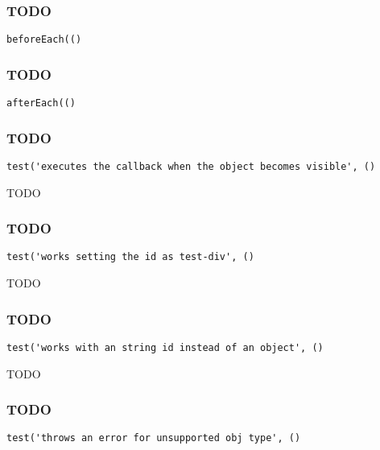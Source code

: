 \documentclass[a4paper]{article}
\begin{document}
\subsubsection{TODO}

\begin{lstlisting}
beforeEach(()
\end{lstlisting}

\hypertarget{toc495}{}
\subsubsection{TODO}

\begin{lstlisting}
afterEach(()
\end{lstlisting}

\hypertarget{toc496}{}
\subsubsection{TODO}

\begin{lstlisting}
test('executes the callback when the object becomes visible', ()
\end{lstlisting}

TODO

\hypertarget{toc497}{}
\subsubsection{TODO}

\begin{lstlisting}
test('works setting the id as test-div', ()
\end{lstlisting}

TODO

\hypertarget{toc498}{}
\subsubsection{TODO}

\begin{lstlisting}
test('works with an string id instead of an object', ()
\end{lstlisting}

TODO

\hypertarget{toc499}{}
\subsubsection{TODO}

\begin{lstlisting}
test('throws an error for unsupported obj type', ()
\end{lstlisting}
\end{document}
